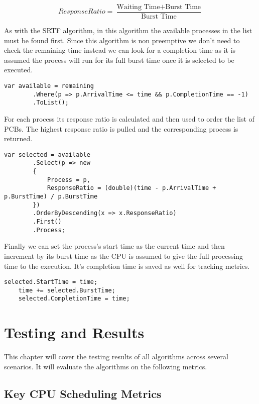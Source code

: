 \documentclass[conference]{report}
\begin{document}
\[
Response Ratio = \frac{\text{Waiting Time} + \text{Burst Time}}{\text{Burst Time}}
\]

As with the SRTF algorithm, in this algorithm the available processes in the list must be found first. Since this algorithm is non preemptive we don't need to check the remaining time instead we can look for a completion time as it is assumed the process will run for its full burst time once it is selected to be executed.

\hfill
\begin{lstlisting}[caption={HRRN Finding Available Processes}, label=code:hrrn-1]
    var available = remaining
        .Where(p => p.ArrivalTime <= time && p.CompletionTime == -1)
        .ToList();
\end{lstlisting}

For each process its response ratio is calculated and then used to order the list of PCBs. The highest response ratio is pulled and the corresponding process is returned.

\hfill
\begin{lstlisting}[caption={HRRN Calculate Response Ratio and Selected Highest}, label=code:hrrn-2]
    var selected = available
        .Select(p => new
        {
            Process = p,
            ResponseRatio = (double)(time - p.ArrivalTime + p.BurstTime) / p.BurstTime
        })
        .OrderByDescending(x => x.ResponseRatio)
        .First()
        .Process;
\end{lstlisting}

Finally we can set the process's start time as the current time and then increment by its burst time as the CPU is assumed to give the full processing time to the execution. It's completion time is saved as well for tracking metrics.

\hfill
\begin{lstlisting}[caption={HRRN Set Start and Completed Time}, label=code:hrrn-3]
    selected.StartTime = time;
    time += selected.BurstTime;
    selected.CompletionTime = time;
\end{lstlisting}

\chapter{Testing and Results}
This chapter will cover the testing results of all algorithms across several scenarios. It will evaluate the algorithms on the following metrics.

\section*{Key CPU Scheduling Metrics}
\end{document}
